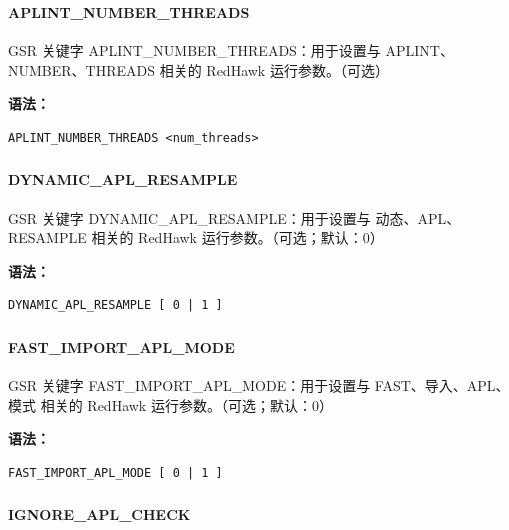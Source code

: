 \subsubsection{}
\paragraph*{APLINT_NUMBER_THREADS}

GSR 关键字 APLINT_NUMBER_THREADS：用于设置与 APLINT、NUMBER、THREADS 相关的 RedHawk 运行参数。（可选）

\textbf{语法：}
\begin{lstlisting}
APLINT_NUMBER_THREADS <num_threads>
\end{lstlisting}

\subsubsection{}
\paragraph*{DYNAMIC_APL_RESAMPLE}

GSR 关键字 DYNAMIC_APL_RESAMPLE：用于设置与 动态、APL、RESAMPLE 相关的 RedHawk 运行参数。（可选；默认：0）

\textbf{语法：}
\begin{lstlisting}
DYNAMIC_APL_RESAMPLE [ 0 | 1 ]
\end{lstlisting}

\subsubsection{}
\paragraph*{FAST_IMPORT_APL_MODE}

GSR 关键字 FAST_IMPORT_APL_MODE：用于设置与 FAST、导入、APL、模式 相关的 RedHawk 运行参数。（可选；默认：0）

\textbf{语法：}
\begin{lstlisting}
FAST_IMPORT_APL_MODE [ 0 | 1 ]
\end{lstlisting}

\subsubsection{}
\paragraph*{IGNORE_APL_CHECK}

